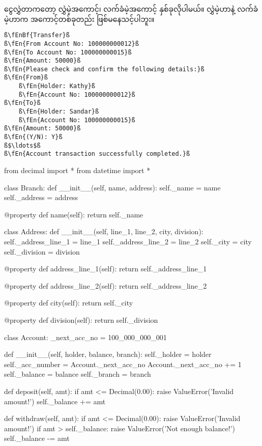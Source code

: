 ငွေလွှဲတာကတော့ လွှဲမဲ့အကောင့်၊ လက်ခံမဲ့အကောင့် နှစ်ခုလိုပါမယ်။ လွှဲမဲ့ဟာနဲ့ လက်ခံမဲ့ဟာက အကောင့်တစ်ခုတည်း ဖြစ်မနေသင့်ပါဘူး။ 
%
\begin{verbatim}
ß\fEnBf{Transfer}ß
ß\fEn{From Account No: 100000000012}ß
ß\fEn{To Account No: 100000000015}ß
ß\fEn{Amount: 50000}ß
ß\fEn{Please check and confirm the following details:}ß
ß\fEn{From}ß
    ß\fEn{Holder: Kathy}ß
    ß\fEn{Account No: 100000000012}ß
ß\fEn{To}ß
    ß\fEn{Holder: Sandar}ß
    ß\fEn{Account No: 100000000015}ß
ß\fEn{Amount: 50000}ß
ß\fEn{(Y/N): Y}ß 
ß$\ldots$ß
ß\fEn{Account transaction successfully completed.}ß
\end{verbatim}
%

%
\begin{py}
from decimal import *
from datetime import *


class Branch:
    def __init__(self, name, address):
        self._name = name
        self._address = address

    @property
    def name(self):
        return self._name


class Address:
    def __init__(self, line_1, line_2, city, division):
        self._address_line_1 = line_1
        self._address_line_2 = line_2
        self._city = city
        self._division = division

    @property
    def address_line_1(self):
        return self._address_line_1

    @property
    def address_line_2(self):
        return self._address_line_2

    @property
    def city(self):
        return self._city

    @property
    def division(self):
        return self._division


class Account:
    _next_acc_no = 100_000_000_001

    def __init__(self, holder, balance, branch):
        self._holder = holder
        self._acc_number = Account._next_acc_no
        Account._next_acc_no += 1
        self._balance = balance
        self._branch = branch
        
    def deposit(self, amt):
        if amt <= Decimal(0.00):
            raise ValueError('Invalid amount!')
        self._balance += amt

    def withdraw(self, amt):
        if amt <= Decimal(0.00):
            raise ValueError('Invalid amount!')
        if amt > self._balance:
            raise ValueError('Not enough balance!')
        self._balance -= amt


\end{py}
